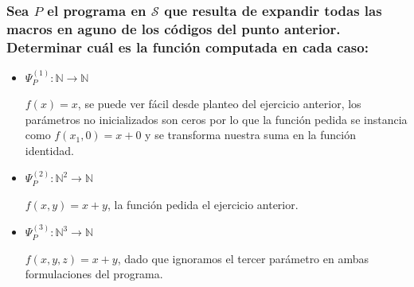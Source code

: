 \documentclass[fleqn, 11pt]{article}
\newcommand{\nat}{\mathbb{N}}
\newcommand{\Scur}{\mathcal{S}}
\begin{document}
\subsubsection{Sea $P$ el programa en $\Scur$ que resulta de expandir todas las
macros en aguno de los códigos del punto anterior. Determinar cuál es la
función computada en cada caso:}

\begin{itemize}
	\item $\Psi^{(1)}_P : \nat   \to \nat$
		
		$f(x) = x$, se puede ver fácil desde planteo del ejercicio
		anterior, los parámetros no inicializados son ceros por lo que
		la función pedida se instancia como  $f(x_1, 0) = x + 0$ y se
		transforma nuestra suma en la función identidad.
	\item $\Psi^{(2)}_P : \nat^2 \to \nat$

		$f(x, y) = x + y$, la función pedida el ejercicio anterior.
	\item $\Psi^{(3)}_P : \nat^3 \to \nat$

		$f(x, y, z) = x + y$, dado que ignoramos el tercer parámetro en
		ambas formulaciones del programa.
\end{itemize}
\end{document}
